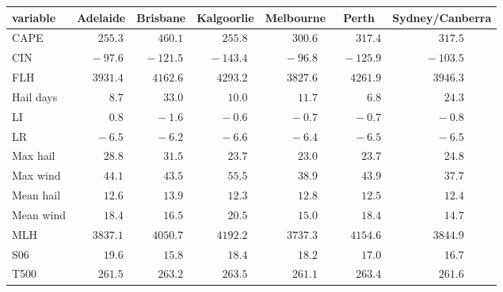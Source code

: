 \begin{tabular}{lcccccc}
\hline
variable  & Adelaide & Brisbane & Kalgoorlie & Melbourne & Perth & \multicolumn{1}{c}{Sydney/Canberra} \\ 
\hline
CAPE  & $\phantom{0}\phantom{-}255.3$ & $\phantom{0}\phantom{-}460.1$ & $\phantom{0}\phantom{-}255.8$ & $\phantom{0}\phantom{-}300.6$ & $\phantom{0}\phantom{-}317.4$ & $\phantom{0}\phantom{-}317.5$ \\
CIN  & $\phantom{00}-97.6$ & $\phantom{0}-121.5$ & $\phantom{0}-143.4$ & $\phantom{00}-96.8$ & $\phantom{0}-125.9$ & $\phantom{0}-103.5$ \\
FLH  & $\phantom{-}3931.4$ & $\phantom{-}4162.6$ & $\phantom{-}4293.2$ & $\phantom{-}3827.6$ & $\phantom{-}4261.9$ & $\phantom{-}3946.3$ \\
Hail days  & $\phantom{000}\phantom{-}8.7$ & $\phantom{00}\phantom{-}33.0$ & $\phantom{00}\phantom{-}10.0$ & $\phantom{00}\phantom{-}11.7$ & $\phantom{000}\phantom{-}6.8$ & $\phantom{00}\phantom{-}24.3$ \\
LI  & $\phantom{000}\phantom{-}0.8$ & $\phantom{000}-1.6$ & $\phantom{000}-0.6$ & $\phantom{000}-0.7$ & $\phantom{000}-0.7$ & $\phantom{000}-0.8$ \\
LR  & $\phantom{000}-6.5$ & $\phantom{000}-6.2$ & $\phantom{000}-6.6$ & $\phantom{000}-6.4$ & $\phantom{000}-6.5$ & $\phantom{000}-6.5$ \\
Max hail  & $\phantom{00}\phantom{-}28.8$ & $\phantom{00}\phantom{-}31.5$ & $\phantom{00}\phantom{-}23.7$ & $\phantom{00}\phantom{-}23.0$ & $\phantom{00}\phantom{-}23.7$ & $\phantom{00}\phantom{-}24.8$ \\
Max wind  & $\phantom{00}\phantom{-}44.1$ & $\phantom{00}\phantom{-}43.5$ & $\phantom{00}\phantom{-}55.5$ & $\phantom{00}\phantom{-}38.9$ & $\phantom{00}\phantom{-}43.9$ & $\phantom{00}\phantom{-}37.7$ \\
Mean hail  & $\phantom{00}\phantom{-}12.6$ & $\phantom{00}\phantom{-}13.9$ & $\phantom{00}\phantom{-}12.3$ & $\phantom{00}\phantom{-}12.8$ & $\phantom{00}\phantom{-}12.5$ & $\phantom{00}\phantom{-}12.4$ \\
Mean wind  & $\phantom{00}\phantom{-}18.4$ & $\phantom{00}\phantom{-}16.5$ & $\phantom{00}\phantom{-}20.5$ & $\phantom{00}\phantom{-}15.0$ & $\phantom{00}\phantom{-}18.4$ & $\phantom{00}\phantom{-}14.7$ \\
MLH  & $\phantom{-}3837.1$ & $\phantom{-}4050.7$ & $\phantom{-}4192.2$ & $\phantom{-}3737.3$ & $\phantom{-}4154.6$ & $\phantom{-}3844.9$ \\
S06  & $\phantom{00}\phantom{-}19.6$ & $\phantom{00}\phantom{-}15.8$ & $\phantom{00}\phantom{-}18.4$ & $\phantom{00}\phantom{-}18.2$ & $\phantom{00}\phantom{-}17.0$ & $\phantom{00}\phantom{-}16.7$ \\
T500  & $\phantom{0}\phantom{-}261.5$ & $\phantom{0}\phantom{-}263.2$ & $\phantom{0}\phantom{-}263.5$ & $\phantom{0}\phantom{-}261.1$ & $\phantom{0}\phantom{-}263.4$ & $\phantom{0}\phantom{-}261.6$ \\
\hline 
\end{tabular}
